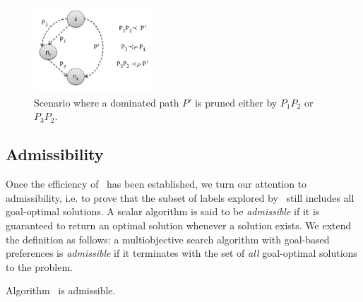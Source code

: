 \begin{demo}
\begin{figure}[!ht]
\centering
\includegraphics[width=0.4\textwidth]{Images/Chapter5/prune}
\caption{Scenario where a dominated path $P'$ is pruned either by $P_1P_2$ or $P_3P_2$.}
\label{fig:4-2-prune}
\end{figure} 

\end{demo}

\subsection{Admissibility}
\label{chapFormalAnalysis:sec:admissibilityLexgo}  

Once the efficiency of \lexgo \ has been established, we turn our attention to admissibility, i.e. to prove that the subset of labels explored by \lexgo \ still includes all goal-optimal solutions. A scalar algorithm is said to be \emph{admissible} if it is guaranteed to return an optimal solution whenever a solution exists. We extend the definition as follows: a multiobjective search algorithm with goal-based preferences is \emph{admissible} if it terminates with the set of \emph{all} goal-optimal solutions to the problem. 

\begin{teorema} \label{chapFormalAnalysis:teo:lexgo-admissible}
Algorithm \lexgo \ is admissible.
\end{teorema}

